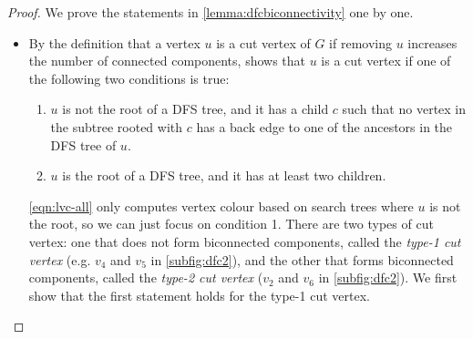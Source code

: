 \dfcbiconnectivity*
\begin{proof}
We prove the statements in \cref{lemma:dfcbiconnectivity} one by one.
\begin{itemize}
    \item By the definition that a vertex $u$ is a cut vertex of $G$ if removing $u$ increases the number of connected components, \citet{Hopcroft1973-lu} shows that $u$ is a cut vertex if one of the following two conditions is true:
        \begin{enumerate}
            \item $u$ is not the root of a DFS tree, and it has a child $c$ such that no vertex in the subtree rooted with $c$ has a back edge to one of the ancestors in the DFS tree of $u$.
            \item $u$ is the root of a DFS tree, and it has at least two children.
        \end{enumerate}
    \cref{eqn:lvc-all} only computes vertex colour based on search trees where $u$ is not the root, so we can just focus on condition 1. There are two types of cut vertex: one that does not form biconnected components, called the \emph{type-1 cut vertex} (e.g. $v_4$ and $v_5$ in \cref{subfig:dfc2}), and the other that forms biconnected components, called the \emph{type-2 cut vertex} ($v_2$ and $v_6$ in \cref{subfig:dfc2}). We first show that the first statement holds for the type-1 cut vertex.
    

\end{itemize}
\end{proof}

